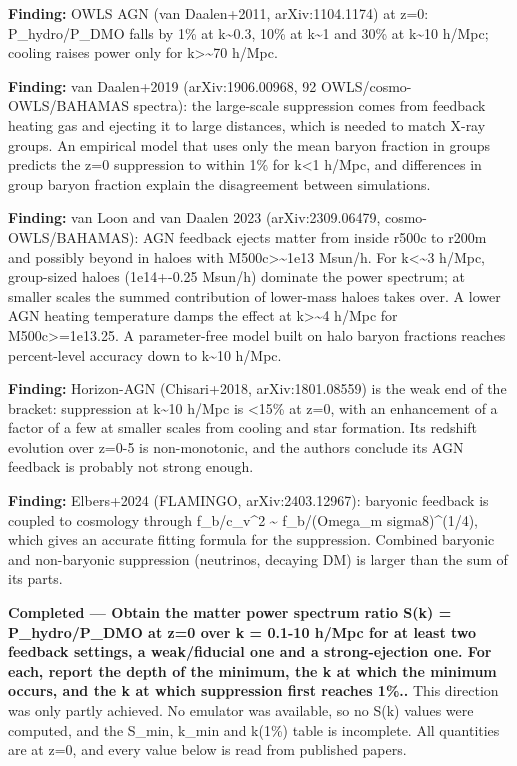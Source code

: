 \documentclass[11pt,a4paper]{article}
\begin{document}
\textbf{Finding:} OWLS AGN (van Daalen+2011, arXiv:1104.1174) at z=0: P\_hydro/P\_DMO falls by 1\% at k\textasciitilde{}0.3, 10\% at k\textasciitilde{}1 and 30\% at k\textasciitilde{}10 h/Mpc; cooling raises power only for k\textgreater{}\textasciitilde{}70 h/Mpc.

\textbf{Finding:} van Daalen+2019 (arXiv:1906.00968, 92 OWLS/cosmo-OWLS/BAHAMAS spectra): the large-scale suppression comes from feedback heating gas and ejecting it to large distances, which is needed to match X-ray groups. An empirical model that uses only the mean baryon fraction in groups predicts the z=0 suppression to within 1\% for k\textless{}1 h/Mpc, and differences in group baryon fraction explain the disagreement between simulations.

\textbf{Finding:} van Loon and van Daalen 2023 (arXiv:2309.06479, cosmo-OWLS/BAHAMAS): AGN feedback ejects matter from inside r500c to r200m and possibly beyond in haloes with M500c\textgreater{}\textasciitilde{}1e13 Msun/h. For k\textless{}\textasciitilde{}3 h/Mpc, group-sized haloes (1e14+-0.25 Msun/h) dominate the power spectrum; at smaller scales the summed contribution of lower-mass haloes takes over. A lower AGN heating temperature damps the effect at k\textgreater{}\textasciitilde{}4 h/Mpc for M500c\textgreater{}=1e13.25. A parameter-free model built on halo baryon fractions reaches percent-level accuracy down to k\textasciitilde{}10 h/Mpc.

\textbf{Finding:} Horizon-AGN (Chisari+2018, arXiv:1801.08559) is the weak end of the bracket: suppression at k\textasciitilde{}10 h/Mpc is \textless{}15\% at z=0, with an enhancement of a factor of a few at smaller scales from cooling and star formation. Its redshift evolution over z=0-5 is non-monotonic, and the authors conclude its AGN feedback is probably not strong enough.

\textbf{Finding:} Elbers+2024 (FLAMINGO, arXiv:2403.12967): baryonic feedback is coupled to cosmology through f\_b/c\_v\textasciicircum{}2 \textasciitilde{} f\_b/(Omega\_m sigma8)\textasciicircum{}(1/4), which gives an accurate fitting formula for the suppression. Combined baryonic and non-baryonic suppression (neutrinos, decaying DM) is larger than the sum of its parts.

\textbf{Completed --- Obtain the matter power spectrum ratio S(k) = P\_hydro/P\_DMO at z=0 over k = 0.1-10 h/Mpc for at least two feedback settings, a weak/fiducial one and a strong-ejection one. For each, report the depth of the minimum, the k at which the minimum occurs, and the k at which suppression first reaches 1\%..} This direction was only partly achieved. No emulator was available, so no S(k) values were computed, and the S\_min, k\_min and k(1\%) table is incomplete. All quantities are at z=0, and every value below is read from published papers.
\end{document}
